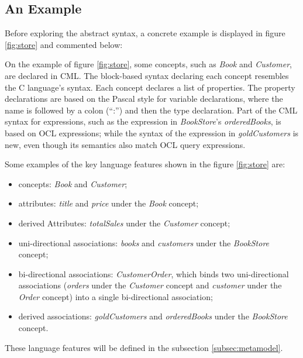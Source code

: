 \subsection{An Example}\label{subsec:example}

Before exploring the abstract syntax, a concrete example is displayed in figure \ref{fig:store} and commented below:



On the example of figure \ref{fig:store}, some concepts, such as \emph{Book} and \emph{Customer}, are declared in CML. 
The block-based syntax declaring each concept resembles the C \cite{clang} language's syntax. 
Each concept declares a list of properties.
The property declarations are based on the Pascal \cite{pascal} style for variable declarations,
where the name is followed by a colon (``:'') and then the type declaration.
Part of the CML syntax for expressions, such as the expression in \emph{BookStore}'s \emph{orderedBooks}, is based on OCL \cite{ocl} expressions; while the syntax of the expression in \emph{goldCustomers} is new, even though its semantics also match OCL \cite{ocl} query expressions.

Some examples of the key language features shown in the figure \ref{fig:store} are:
\begin{itemize}
\item concepts: \emph{Book} and \emph{Customer};
\item attributes: \emph{title} and \emph{price} under the \emph{Book} concept;  
\item derived Attributes: \emph{totalSales} under the \emph{Customer} concept;
\item uni-directional associations: \emph{books} and \emph{customers} under the \emph{BookStore} concept;
\item bi-directional associations: \emph{CustomerOrder},
which binds two uni-directional associations (\emph{orders} under the \emph{Customer} concept and \emph{customer} under the \emph{Order} concept) into a single bi-directional association;
\item derived associations: \emph{goldCustomers} and \emph{orderedBooks} under the \emph{BookStore} concept.
\end{itemize}

These language features will be defined in the subsection \ref{subsec:metamodel}.